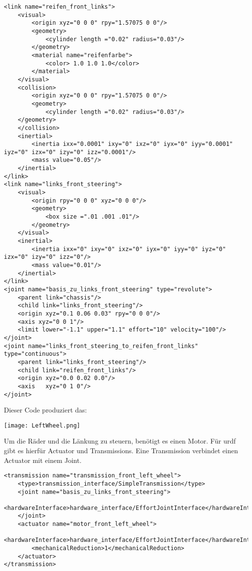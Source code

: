 \begin{lstlisting}
<link name="reifen_front_links">
    <visual>
        <origin xyz="0 0 0" rpy="1.57075 0 0"/>
        <geometry>
            <cylinder length ="0.02" radius="0.03"/>
        </geometry>
        <material name="reifenfarbe">
            <color> 1.0 1.0 1.0</color>
        </material>
    </visual>
    <collision>
        <origin xyz="0 0 0" rpy="1.57075 0 0"/>
        <geometry>
            <cylinder length ="0.02" radius="0.03"/>
    </geometry>
    </collision>
    <inertial>
        <inertia ixx="0.0001" ixy="0" ixz="0" iyx="0" iyy="0.0001" iyz="0" izx="0" izy="0" izz="0.0001"/>
        <mass value="0.05"/>
    </inertial>
</link>
<link name="links_front_steering">
    <visual>
        <origin rpy="0 0 0" xyz="0 0 0"/>
        <geometry>
            <box size =".01 .001 .01"/>
        </geometry>
    </visual>
    <inertial>
        <inertia ixx="0" ixy="0" ixz="0" iyx="0" iyy="0" iyz="0" izx="0" izy="0" izz="0"/>
        <mass value="0.01"/>
    </inertial>
</link>
<joint name="basis_zu_links_front_steering" type="revolute">
    <parent link="chassis"/>
    <child link="links_front_steering"/>
    <origin xyz="0.1 0.06 0.03" rpy="0 0 0"/>
    <axis xyz="0 0 1"/>
    <limit lower="-1.1" upper="1.1" effort="10" velocity="100"/>
</joint>
<joint name="links_front_steering_to_reifen_front_links" type="continuous">
    <parent link="links_front_steering"/>
    <child link="reifen_front_links"/>
    <origin xyz="0.0 0.02 0.0"/>
    <axis   xyz="0 1 0"/>
</joint>
\end{lstlisting}
Dieser Code produziert das:
\begin{center}
    \texttt{[image: LeftWheel.png]}
\end{center}

Um die Räder und die Länkung zu steuern, benötigt es einen Motor. 
Für urdf gibt es hierfür Actuator und Transmissions.
Eine Transmission verbindet einen Actuator mit einem Joint. 

\begin{lstlisting}
<transmission name="transmission_front_left_wheel">
    <type>transmission_interface/SimpleTransmission</type>
    <joint name="basis_zu_links_front_steering">
        <hardwareInterface>hardware_interface/EffortJointInterface</hardwareInterface>
    </joint>
    <actuator name="motor_front_left_wheel">
        <hardwareInterface>hardware_interface/EffortJointInterface</hardwareInterface>
        <mechanicalReduction>1</mechanicalReduction>
    </actuator>
</transmission>
\end{lstlisting}

